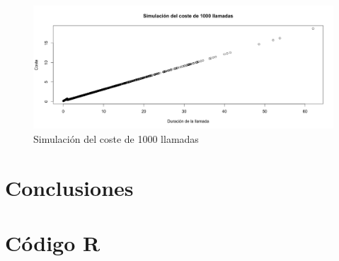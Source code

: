 \documentclass[12pt,a4paper,twoside,openright,titlepage,final]{article}
\begin{document}
\begin{figure}[tbph!]
\centering
\includegraphics[width=0.9\linewidth]{imagenes/simulacion}
\caption{Simulación del coste de 1000 llamadas}
\label{fig:simulacion}
\end{figure}

\section{Conclusiones}
   

\newpage

\section{Código R}


\end{document}
